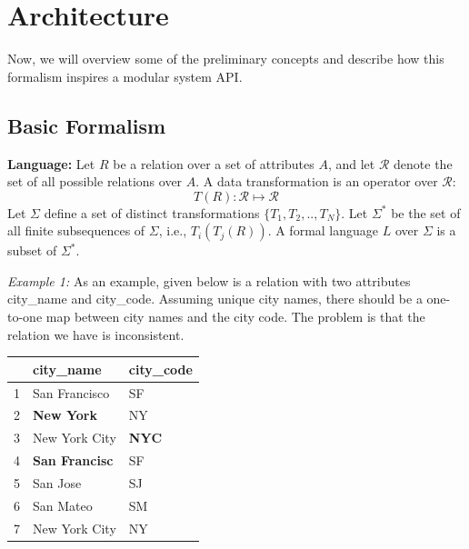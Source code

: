



\section{Architecture}
Now, we will overview some of the preliminary concepts and describe how this formalism inspires a modular system API.


 \subsection{Basic Formalism}
\vspace{0.25em} \noindent \textbf{Language: } Let $R$ be a relation over a set of attributes $A$, and let $\mathcal{R}$ denote the set of all possible relations over $A$.
A data transformation is an operator over $\mathcal{R}$: 
\[T(R): \mathcal{R} \mapsto  \mathcal{R}\]
Let $\Sigma$ define a set of distinct transformations $\{T_1, T_2,..,T_N\}$.
Let $\Sigma^*$ be the set of all finite subsequences of $\Sigma$, i.e., $T_i(T_j(R))$.
A formal language $L$ over  $\Sigma$ is a subset of $\Sigma^*$.

\vspace{0.5em} \noindent \emph{Example 1: } As an example, given below is a relation with two attributes \textsf{city\_name} and \textsf{city\_code}. 
Assuming unique city names, there should be a one-to-one map between city names and the city code. The problem is that the relation we have is inconsistent.

\begin{table}[ht!]
\centering
\label{my-label}
\begin{tabular}{|l|l|l|}
\hline
\rowcolor[HTML]{000000} 
& {\color[HTML]{FFFFFF} city\_name}            & {\color[HTML]{FFFFFF} city\_code}   \\ \hline
1 & San Francisco                                & SF                                  \\ \hline
2& {\color[HTML]{FE0000} \textbf{New York}}     & NY                                  \\ \hline
3 & New York City                                & {\color[HTML]{FE0000} \textbf{NYC}} \\ \hline
4 & {\color[HTML]{FE0000} \textbf{San Francisc}} & SF                                  \\ \hline
5 & San Jose                                     & SJ                                  \\ \hline
6 & San Mateo                                    & SM                                  \\ \hline
7 & New York City                                & NY                                  \\ \hline
\end{tabular}
\end{table}

